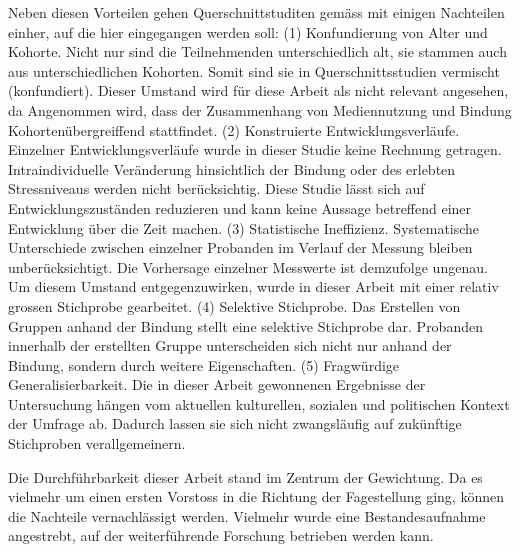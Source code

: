 Neben diesen Vorteilen gehen Querschnittstuditen gemäss  mit einigen Nachteilen einher, auf die hier eingegangen werden soll: (1) Konfundierung von Alter und Kohorte. Nicht nur sind die Teilnehmenden unterschiedlich alt, sie stammen auch aus unterschiedlichen Kohorten. Somit sind sie in Querschnittsstudien vermischt (konfundiert). Dieser Umstand wird für diese Arbeit als nicht relevant angesehen, da Angenommen wird, dass der Zusammenhang von Mediennutzung und Bindung Kohortenübergreiffend stattfindet. (2) Konstruierte Entwicklungsverläufe. Einzelner Entwicklungsverläufe wurde in dieser Studie keine Rechnung getragen. Intraindividuelle Veränderung hinsichtlich der Bindung oder des erlebten Stressniveaus werden nicht berücksichtig. Diese Studie lässt sich auf Entwicklungszuständen reduzieren und kann keine Aussage betreffend einer Entwicklung über die Zeit machen. (3) Statistische Ineffizienz. Systematische Unterschiede zwischen einzelner Probanden im Verlauf der Messung bleiben unberücksichtigt. Die Vorhersage einzelner Messwerte ist demzufolge ungenau. Um diesem Umstand entgegenzuwirken, wurde in dieser Arbeit mit einer relativ grossen Stichprobe gearbeitet. (4) Selektive Stichprobe. Das Erstellen von Gruppen anhand der Bindung stellt eine selektive Stichprobe dar. Probanden innerhalb der erstellten Gruppe unterscheiden sich nicht nur anhand der Bindung, sondern durch weitere Eigenschaften. (5) Fragwürdige Generalisierbarkeit. Die in dieser Arbeit gewonnenen Ergebnisse der Untersuchung hängen vom aktuellen kulturellen, sozialen und politischen Kontext der Umfrage ab. Dadurch lassen sie sich nicht zwangsläufig auf zukünftige Stichproben verallgemeinern. 

Die Durchführbarkeit dieser Arbeit stand im Zentrum der Gewichtung. Da es vielmehr um einen ersten Vorstoss in die Richtung der Fagestellung ging, können die Nachteile vernachlässigt werden. Vielmehr wurde eine Bestandesaufnahme angestrebt, auf der weiterführende Forschung betrieben werden kann.

